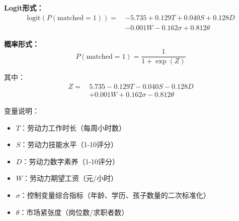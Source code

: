 \documentclass[12pt, a4paper]{article}
\begin{document}
\textbf{Logit形式：}
\begin{equation}
\begin{aligned}
\text{logit}(P(\text{matched}=1)) = \, &-5.735 + 0.129T + 0.040S + 0.128D \\
&- 0.001W - 0.162\sigma + 0.812\theta
\end{aligned}
\end{equation}

\textbf{概率形式：}
\begin{equation}
P(\text{matched}=1) = \frac{1}{1 + \exp(Z)}
\end{equation}

其中：
\begin{equation}
\begin{aligned}
Z = \, &5.735 - 0.129T - 0.040S - 0.128D \\
&+ 0.001W + 0.162\sigma - 0.812\theta
\end{aligned}
\end{equation}

\vspace{0.3cm}

变量说明：
\begin{itemize}
    \item $T$：劳动力工作时长（每周小时数）
    \item $S$：劳动力技能水平（1-10评分）
    \item $D$：劳动力数字素养（1-10评分）
    \item $W$：劳动力期望工资（元/小时）
    \item $\sigma$：控制变量综合指标（年龄、学历、孩子数量的二次标准化）
    \item $\theta$：市场紧张度（岗位数/求职者数）
\end{itemize}
\end{document}
